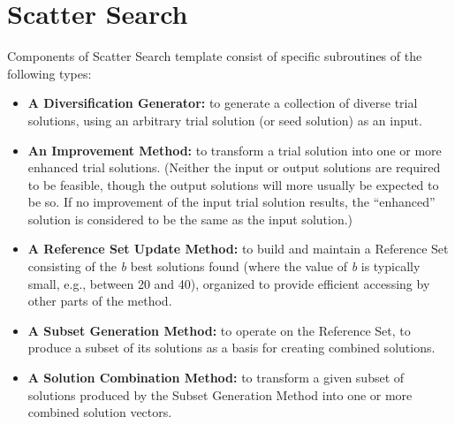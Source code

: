 \section{Scatter Search}
Components of Scatter Search template \cite{glover1998template}
consist of
specific subroutines of the following types:
\begin{itemize}
\item \textbf{A Diversification Generator:}
  to generate
  a collection of diverse trial solutions,
  using an arbitrary trial solution
  (or seed solution) as an input.
\item \textbf{An Improvement Method:}
  to transform
  a trial solution
  into one or more enhanced trial solutions. 
  (Neither
  the input or output solutions
  are required to be feasible,
  though the output solutions
  will more usually be expected to be so.
  If no improvement
  of the input trial solution results, 
  the ``enhanced'' solution
  is considered to be
  the same as the input solution.)
\item \textbf{A Reference Set Update Method:}
  to build and maintain a Reference Set
  consisting of the \textit{b} best solutions found
  (where the value of \textit{b}
  is typically small,
  e.g., between 20 and 40),
  organized to provide efficient accessing
  by other parts of the method.
\item \textbf{A Subset Generation Method:}
  to operate
  on the Reference Set,
  to produce
  a subset of its solutions
  as a basis
  for creating
  combined solutions.
\item \textbf{A Solution Combination Method:}
  to transform
  a given subset of solutions 
  produced by the Subset Generation Method
  into
  one or more combined solution vectors.
\end{itemize}



